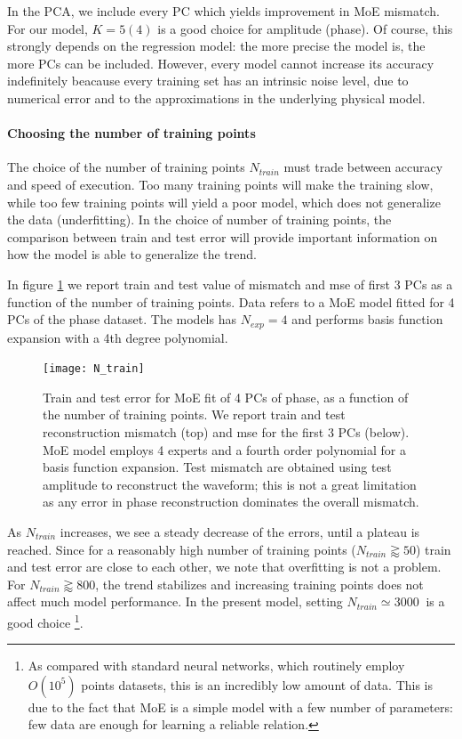 In the PCA, we include every PC which yields improvement in MoE mismatch. For our model, $K = 5(4)$ is a good choice for amplitude (phase).
Of course, this strongly depends on the regression model: the more precise the model is, the more PCs can be included.
However, every model cannot increase its accuracy indefinitely beacause every training set has an intrinsic noise level, due to numerical error and to the approximations in the underlying physical model.
\paragraph{Choosing the number of training points}
The choice of the number of training points $N_{train}$ must trade between accuracy and speed of execution. Too many training points will make the training slow, while too few training points will yield a poor model, which does not generalize the data (underfitting).
In the choice of number of training points, the comparison between train and test error will provide important information on how the model is able to generalize the trend.

In figure \ref{fig:N_train} we report train and test value of mismatch and mse of first 3 PCs as a function of the number of training points. Data refers to a MoE model fitted for 4 PCs of the phase dataset. The models has ${N_{exp} = 4}$ and performs basis function expansion with a 4th degree polynomial.
\begin{figure}
	\centering
    \texttt{[image: N\_train]}
	\caption{Train and test error for MoE fit of 4 PCs of phase, as a function of the number of training points. We report train and test reconstruction mismatch (top) and mse for the first 3 PCs (below).
    MoE model employs 4 experts and a fourth order polynomial for a basis function expansion.
	Test mismatch are obtained using test amplitude to reconstruct the waveform; this is not a great limitation as any error in phase reconstruction dominates the overall mismatch.
    }
	\label{fig:N_train}
\end{figure}

As $N_{train}$ increases, we see a steady decrease of the errors, until a plateau is reached.
Since for a reasonably high number of training points ($N_{train} \gtrapprox 50$) train and test error are close to each other, we note that overfitting is not a problem.
For $N_{train} \gtrapprox 800$, the trend stabilizes and increasing training points does not affect much model performance.
In the present model, setting $N_{train} \simeq \SI{3000}{}$ is a good choice
\footnote{As compared with standard neural networks, which routinely employ $O(10^5)$ points datasets, this is an incredibly low amount of data. This is due to the fact that MoE is a simple model with a few number of parameters: few data are enough for learning a reliable relation.}.
